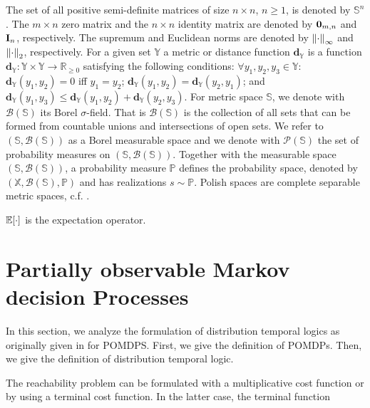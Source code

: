 \documentclass[conference]{IEEEtran}
\newcommand{\X}{{\mathbb{X}}}
\newcommand{\Y}{{\mathbb{Y}}}
\newcommand{\po}{\mathbb{P}}     %
\renewcommand{\S}{\mathbb S}
\begin{document}
    
    The set of all positive semi-definite matrices of size
    $n \times n$, $n \geq 1$, is denoted by $\S^n$.    The $m \times n$ zero matrix and
    the $n \times n$ identity matrix are denoted by
    $\mathbf{0}_{m, n}$ and $\mathbf{I}_n$, respectively.
    The supremum and Euclidean norms are denoted by
    $\left\| {\cdot} \right\|_{\infty}$ and $\left\| {\cdot} \right\|_{2}$, respectively.
    For a given set $\Y$ a metric or distance function $\mathbf d_\Y$ is a function $\mathbf{d}_\Y: \Y\times \Y\rightarrow \mathbb R_{\ge 0}$ 
satisfying the following conditions: 
$\forall y_1,y_2,y_3\in\Y$:
$\mathbf d_\Y(y_1,y_2)=0$ iff $y_1=y_2$; 
$\mathbf d_\Y(y_1,y_2)=\mathbf d_{\Y}(y_2,y_1)$;  and
$\mathbf d_\Y(y_1,y_3)\leq \mathbf d_\Y(y_1,y_2) +\mathbf d_\Y(y_2,y_3)$. 
For metric space $\mathbb S$, we denote with  $\mathcal{B}(\mathbb S)$ its Borel $\sigma$-field. That is  $\mathcal{B}(\mathbb S)$ is the  
collection of all sets that can be formed from countable unions and intersections of open sets.
We refer to  $(\mathbb S,\mathcal{B}(\mathbb S))$ as a Borel measurable space and we denote with $\mathcal P(\mathbb S)$ the set of probability measures on $(\mathbb S,\mathcal{B}(\mathbb S))$.
Together with the measurable space $(\mathbb S,\mathcal{B}(\mathbb S))$,  a probability measure $\po$ defines the probability space, denoted by $(\X,\mathcal{B}(\mathbb S),\po)$ and has realizations  $s\sim \po$.   
Polish spaces are complete separable metric spaces, c.f. \cite{bogachev2007measure}. 

    $\mathbb{E}[\cdot]$ is the expectation operator.

    
    
\section{Partially observable Markov decision Processes}
In this section, we  analyze the formulation of distribution temporal logics as originally given in \cite{JonesDTL2013} for POMDPS. 
First, we give the definition of POMDPs. Then,  we  give the definition of distribution temporal logic. 


The reachability problem can be formulated with a multiplicative cost function or by using a terminal cost function. In the latter case, the terminal function 


 
\end{document}
